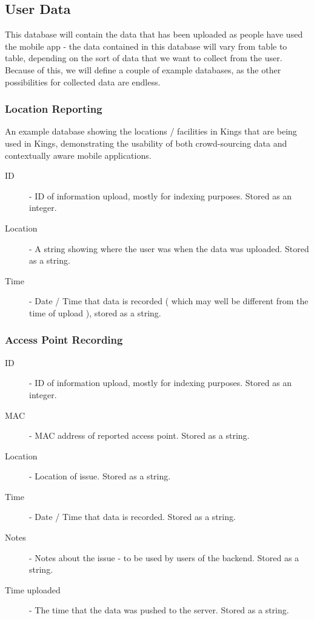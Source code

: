 \documentclass[11pt]{informatics-report}
\begin{document}
\subsection{User Data}

This database will contain the data that has been uploaded as people have used the mobile app - the data contained in this database will vary from table to table, depending on the sort of data that we want to collect from the user. Because of this, we will define a couple of example databases, as the other possibilities for collected data are endless. 

\subsubsection{Location Reporting}

An example database showing the locations / facilities in Kings that are being used in Kings, demonstrating the usability of both crowd-sourcing data and contextually aware mobile applications. 

\begin{description}
\item[ID] - ID of information upload, mostly for indexing purposes. Stored as an integer.
\item[Location] - A string showing where the user was when the data was uploaded. Stored as a string.
\item[Time] - Date / Time that data is recorded ( which may well be different from the time of upload ), stored as a string.
\end{description}
\newpage

\subsubsection{Access Point Recording}
\begin{description}
\item[ID] - ID of information upload, mostly for indexing purposes. Stored as an integer.
\item[MAC] - MAC address of reported access point. Stored as a string.
\item[Location] - Location of issue. Stored as a string.
\item[Time] - Date / Time that data is recorded. Stored as a string.
\item[Notes] - Notes about the issue - to be used by users of the backend. Stored as a string.
\item[Time uploaded] - The time that the data was pushed to the server. Stored as a string.
\end{description}
\end{document}
